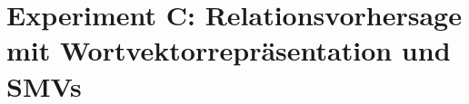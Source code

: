 
\chapter{Experiment C: Relationsvorhersage mit Wortvektorrepräsentation und SMVs} %

\label{Chapter8} %

